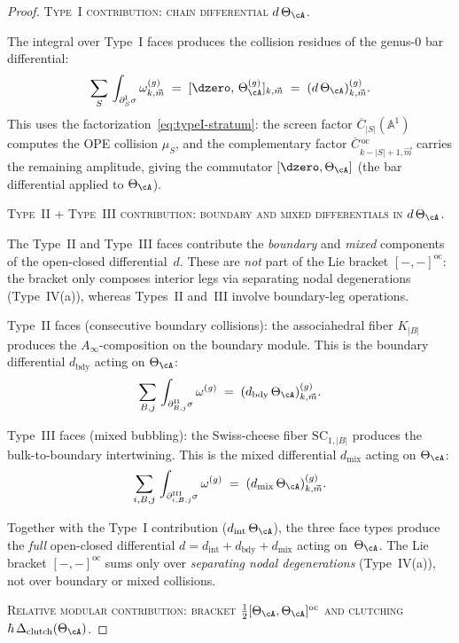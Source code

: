 \begin{proof}
\medskip
\noindent\textsc{Type~I contribution:
chain differential $d\,\Theta_\cA$.}

The integral over Type~I faces produces the collision
residues of the genus-$0$ bar differential:
\[
\sum_{S}\,
\int_{\partial_S^{\mathrm{I}}\sigma}
\omega^{(g)}_{k,\vec{m}}
\;=\;
[\dzero,\, \Theta_\cA^{(g)}]_{k, \vec{m}}
\;=\;
(d\,\Theta_\cA)^{(g)}_{k, \vec{m}}.
\]
This uses the factorization~\eqref{eq:typeI-stratum}: the
screen factor $\overline{C}_{|S|}(\mathbb{A}^1)$ computes the
OPE collision $\mu_S$, and the complementary factor
$\overline{C}{}^{\,\mathrm{oc}}_{k-|S|+1, \vec{m}}$ carries
the remaining amplitude, giving the commutator
$[\dzero, \Theta_\cA]$ (the bar differential applied to
$\Theta_\cA$).

\medskip
\noindent\textsc{Type~II + Type~III contribution:
boundary and mixed differentials in $d\,\Theta_\cA$.}

The Type~II and Type~III faces contribute the
\emph{boundary} and \emph{mixed} components of the
open-closed differential~$d$. These are \emph{not} part of
the Lie bracket $[-,-]^{\mathrm{oc}}$: the bracket only
composes interior legs via separating nodal degenerations
(Type~IV(a)), whereas Types~II and~III involve
boundary-leg operations.

Type~II faces (consecutive boundary collisions): the
associahedral fiber $K_{|B|}$ produces the
$A_\infty$-composition on the boundary module. This is the
boundary differential $d_{\mathrm{bdy}}$ acting on
$\Theta_\cA$:
\[
\sum_{B,j}\,
\int_{\partial_{B,j}^{\mathrm{II}}\sigma}
\omega^{(g)}
\;=\;
(d_{\mathrm{bdy}}\,\Theta_\cA)^{(g)}_{k, \vec{m}}.
\]

Type~III faces (mixed bubbling): the Swiss-cheese fiber
$\mathrm{SC}_{1, |B|}$ produces the bulk-to-boundary
intertwining. This is the mixed differential
$d_{\mathrm{mix}}$ acting on $\Theta_\cA$:
\[
\sum_{i,B,j}\,
\int_{\partial_{i,B,j}^{\mathrm{III}}\sigma}
\omega^{(g)}
\;=\;
(d_{\mathrm{mix}}\,\Theta_\cA)^{(g)}_{k, \vec{m}}.
\]

Together with the Type~I contribution
($d_{\mathrm{int}}\,\Theta_\cA$), the three face types
produce the \emph{full} open-closed differential
$d = d_{\mathrm{int}} + d_{\mathrm{bdy}} + d_{\mathrm{mix}}$
acting on~$\Theta_\cA$. The Lie bracket
$[-,-]^{\mathrm{oc}}$ sums only over \emph{separating nodal
degenerations} (Type~IV(a)), not over boundary or mixed
collisions.

\medskip
\noindent\textsc{Relative modular contribution:
bracket $\tfrac{1}{2}[\Theta_\cA, \Theta_\cA]^{\mathrm{oc}}$
and clutching $\hbar\,\Delta_{\mathrm{clutch}}(\Theta_\cA)$.}


\end{proof}
